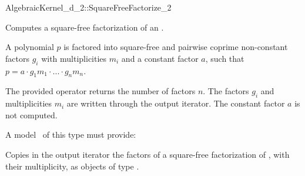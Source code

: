 \begin{ccRefFunctionObjectConcept}{AlgebraicKernel_d_2::SquareFreeFactorize_2}

\ccDefinition
Computes a square-free factorization of an
.

A polynomial $p$ is factored into square-free and pairwise 
coprime non-constant factors $g_i$ with multiplicities $m_i$ 
and a constant factor $a$, such that 
$p = a  \cdot  g_1m_1  \cdot  ...  \cdot  g_nm_n$.

The provided operator returns the number of factors $n$.
The factors $g_i$ and multiplicities $m_i$ are written through the 
output iterator. 
The constant factor $a$ is not computed. 

\ccRefines 
{} 

\ccTypes
{}
\ccGlue
{}


\ccOperations
{}

A model \ccVar\ of this type must provide:

{Copies in the output iterator the factors of a square-free 
factorization of , with their multiplicity, as objects of type 
.}

\ccSeeAlso
{}\\
\\

\end{ccRefFunctionObjectConcept}
